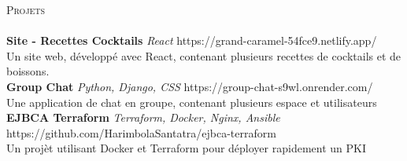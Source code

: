 \documentclass[a4paper]{article}
\newcommand{\lineunder} {
    \vspace*{-8pt} \\
    \hspace*{-18pt} \hrulefill \\
}
\newcommand{\header} [1] {
    {\hspace*{-18pt}\vspace*{6pt} \textsc{#1}}
    \vspace*{-6pt} \lineunder
}
\begin{document}
\header{Projets}
{\textbf{Site - Recettes Cocktails}} {\sl React} \hfill https://grand-caramel-54fce9.netlify.app/\\
Un site web, développé avec React, contenant plusieurs recettes de cocktails et de boissons.\\
\vspace*{2mm}
{\textbf{Group Chat}} {\sl Python, Django, CSS} \hfill https://group-chat-s9wl.onrender.com/\\
Une application de chat en groupe, contenant plusieurs espace et utilisateurs\\
\vspace*{2mm}
{\textbf{EJBCA Terraform}} {\sl Terraform, Docker, Nginx, Ansible} \hfill https://github.com/HarimbolaSantatra/ejbca-terraform\\
Un projèt utilisant Docker et Terraform pour déployer rapidement un PKI\\
\vspace*{2mm}



\ 
\end{document}
